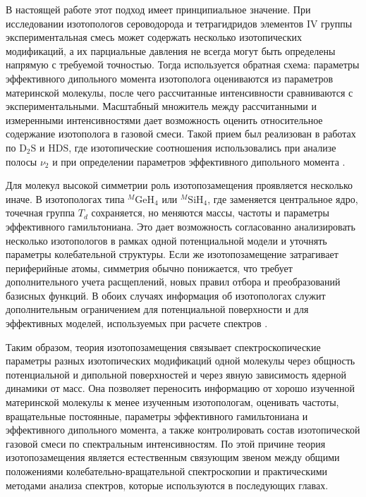 В настоящей работе этот подход имеет принципиальное значение. При исследовании
изотопологов сероводорода и тетрагидридов элементов IV группы экспериментальная
смесь может содержать несколько изотопических модификаций, а их парциальные
давления не всегда могут быть определены напрямую с требуемой точностью. Тогда
используется обратная схема: параметры эффективного дипольного момента
изотополога оцениваются из параметров материнской молекулы, после чего
рассчитанные интенсивности сравниваются с экспериментальными. Масштабный
множитель между рассчитанными и измеренными интенсивностями дает возможность
оценить относительное содержание изотополога в газовой смеси. Такой прием был
реализован в работах по $\mathrm{D_2S}$ и $\mathrm{HDS}$, где изотопические
соотношения использовались при анализе полосы $\nu_2$ и при определении
параметров эффективного дипольного момента \cite{d2s_sydow2019,hds_sydow2019}.

Для молекул высокой симметрии роль изотопозамещения проявляется несколько
иначе. В изотопологах типа $^{M}\mathrm{GeH_4}$ или $^{M}\mathrm{SiH_4}$, где
заменяется центральное ядро, точечная группа $T_d$ сохраняется, но меняются
массы, частоты и параметры эффективного гамильтониана. Это дает возможность
согласованно анализировать несколько изотопологов в рамках одной потенциальной
модели и уточнять параметры колебательной структуры. Если же изотопозамещение
затрагивает периферийные атомы, симметрия обычно понижается, что требует
дополнительного учета расщеплений, новых правил отбора и преобразований
базисных функций. В обоих случаях информация об изотопологах служит
дополнительным ограничением для потенциальной поверхности и для эффективных
моделей, используемых при расчете спектров \cite{872,4300}.

Таким образом, теория изотопозамещения связывает спектроскопические параметры
разных изотопических модификаций одной молекулы через общность потенциальной и
дипольной поверхностей и через явную зависимость ядерной динамики от масс.
Она позволяет переносить информацию от хорошо изученной материнской молекулы к
менее изученным изотопологам, оценивать частоты, вращательные постоянные,
параметры эффективного гамильтониана и эффективного дипольного момента, а также
контролировать состав изотопической газовой смеси по спектральным интенсивностям.
По этой причине теория изотопозамещения является естественным связующим звеном
между общими положениями колебательно-вращательной спектроскопии и практическими
методами анализа спектров, которые используются в последующих главах.

